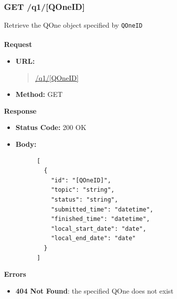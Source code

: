 \subsubsection{GET /q1/[QOneID]}
Retrieve the QOne object specified by \verb|QOneID| \\\\
\textbf{Request}
\begin{itemize}
  \item \textbf{URL:}
  \begin{quote}
    \url{/q1/[QOneID]}
  \end{quote}
  \item \textbf{Method:} GET
\end{itemize}\leavevmode\newline
\textbf{Response}
\begin{itemize}
  \item \textbf{Status Code:} 200 OK
  \item \textbf{Body:}
    \begin{lstlisting}
      [
        {
          "id": "[QOneID]",
          "topic": "string",
          "status": "string",
          "submitted_time": "datetime",
          "finished_time": "datetime",
          "local_start_date": "date",
          "local_end_date": "date"
        }
      ]
    \end{lstlisting}
\end{itemize}\leavevmode\newline
\textbf{Errors}
\begin{itemize}
  \item \textbf{404 Not Found}: the specified QOne does not exist
\end{itemize}

